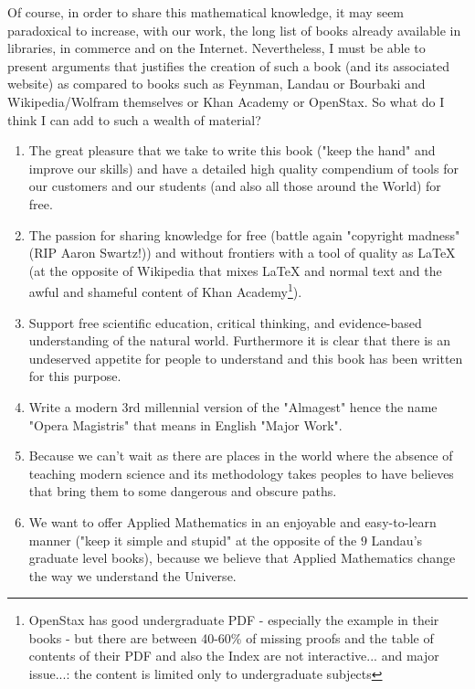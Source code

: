 	Of course, in order to share this mathematical knowledge, it may seem paradoxical to increase, with our work, the long list of books already available in libraries, in commerce and on the Internet. Nevertheless, I must be able to present arguments that justifies the creation of such a book (and its associated website) as compared to books such as Feynman, Landau or Bourbaki and Wikipedia/Wolfram themselves or Khan Academy or OpenStax. So what do I think I can add to such a wealth of material? 
	\begin{enumerate}
		\item The great pleasure that we take to write this book ("keep the hand" and improve our skills) and have a detailed high quality compendium of tools for our customers and our students (and also all those around the World) for free.

		\item The passion for sharing knowledge for free (battle again "copyright madness" (RIP Aaron Swartz!)) and without frontiers with a tool of quality as \LaTeX{} (at the opposite of Wikipedia that mixes \LaTeX{} and normal text and the awful and shameful content of Khan Academy\footnote{OpenStax has good undergraduate PDF - especially the example in their books - but there are between 40-60\% of missing proofs and the table of contents of their PDF and also the Index are not interactive... and major issue...: the content is limited only to undergraduate subjects}).
		
		\item Support free scientific education, critical thinking, and evidence-based understanding of the natural world. Furthermore it is clear that there is an undeserved appetite for people to understand and this book has been written for this purpose.
		
		\item Write a modern 3rd millennial version of the "Almagest" hence the name "Opera Magistris" that means in English "Major Work".
		
		\item Because we can't wait as there are places in the world where the absence of teaching modern science and its methodology takes peoples to have believes that bring them to some dangerous and obscure paths.
		
		\item We want to offer Applied Mathematics in an enjoyable and easy-to-learn manner ("keep it simple and stupid" at the opposite of the $9$ Landau's graduate level books), because we believe that Applied Mathematics change the way we understand the Universe.
		

\end{enumerate}
